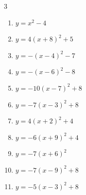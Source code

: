 \begin{multicols}{3}
\begin{enumerate}
  \item $\displaystyle y=x^{2}-4$

        \phantom{$\displaystyle 頂点\left( 0 , -4 \right)$}

  \item $\displaystyle y=4\left( x+8\right)^{2}+5$

        \phantom{$\displaystyle 頂点\left( -8 , 5 \right)$}

  \item $\displaystyle y=-\left( x-4\right)^{2}-7$

        \phantom{$\displaystyle 頂点\left( 4 , -7 \right)$}

  \item $\displaystyle y=-\left( x-6\right)^{2}-8$

        \phantom{$\displaystyle 頂点\left( 6 , -8 \right)$}

  \item $\displaystyle y=-10\left( x-7\right)^{2}+8$

        \phantom{$\displaystyle 頂点\left( 7 , 8 \right)$}

  \item $\displaystyle y=-7\left( x-3\right)^{2}+8$

        \phantom{$\displaystyle 頂点\left( 3 , 8 \right)$}

  \item $\displaystyle y=4\left( x+2\right)^{2}+4$

        \phantom{$\displaystyle 頂点\left( -2 , 4 \right)$}

\columnbreak %

  \item $\displaystyle y=-6\left( x+9\right)^{2}+4$

        \phantom{$\displaystyle 頂点\left( -9 , 4 \right)$}

  \item $\displaystyle y=-7\left( x+6\right)^{2}$

        \phantom{$\displaystyle 頂点\left( -6 , 0 \right)$}

  \item $\displaystyle y=-7\left( x-9\right)^{2}+8$

        \phantom{$\displaystyle 頂点\left( 9 , 8 \right)$}

  \item $\displaystyle y=-5\left( x-3\right)^{2}+8$

        \phantom{$\displaystyle 頂点\left( 3 , 8 \right)$}


\end{enumerate}
\end{multicols}
